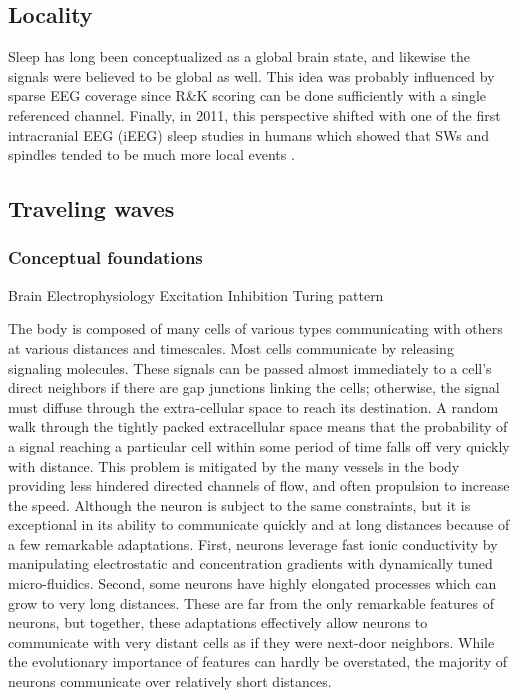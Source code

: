 \subsection*{Locality}
Sleep has long been conceptualized as a global brain state, and likewise the signals were believed to be global as well. This idea was probably influenced by sparse EEG coverage since R\&K scoring can be done sufficiently with a single referenced channel. Finally, in 2011, this perspective shifted with one of the first intracranial EEG (iEEG) sleep studies in humans which showed that SWs and spindles tended to be much more local events \cite{Nir2011}.

\subsection*{Traveling waves}
\subsubsection*{Conceptual foundations}
Brain Electrophysiology Excitation Inhibition Turing pattern

The body is composed of many cells of various types communicating with others at various distances and timescales. Most cells communicate by releasing signaling molecules. These signals can be passed almost immediately to a cell’s direct neighbors if there are gap junctions linking the cells; otherwise, the signal must diffuse through the extra-cellular space to reach its destination. A random walk through the tightly packed extracellular space means that the probability of a signal reaching a particular cell within some period of time falls off very quickly with distance. This problem is mitigated by the many vessels in the body providing less hindered directed channels of flow, and often propulsion to increase the speed. Although the neuron is subject to the same constraints, but it is exceptional in its ability to communicate quickly and at long distances because of a few remarkable adaptations. First, neurons leverage fast ionic conductivity by manipulating electrostatic and concentration gradients with dynamically tuned micro-fluidics. Second, some neurons have highly elongated processes which can grow to very long distances. These are far from the only remarkable features of neurons, but together, these adaptations effectively allow neurons to communicate with very distant cells as if they were next-door neighbors. While the evolutionary importance of features can hardly be overstated, the majority of neurons communicate over relatively short distances.

